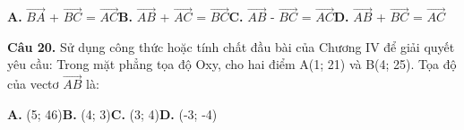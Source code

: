 \documentclass[11pt,a4paper]{article}
\begin{document}
\hspace*{1.5em}\textbf{A.} $\overrightarrow{BA}$ + $\overrightarrow{BC}$ = $\overrightarrow{AC}$\quad\quad \textbf{B.} $\overrightarrow{AB}$ + $\overrightarrow{AC}$ = $\overrightarrow{BC}$\quad\quad \textbf{C.} $\overrightarrow{AB}$ - $\overrightarrow{BC}$ = $\overrightarrow{AC}$\quad\quad \textbf{D.} $\overrightarrow{AB}$ + $\overrightarrow{BC}$ = $\overrightarrow{AC}$\par\vspace{2pt}
\textbf{\color{primary} Câu 20.} Sử dụng công thức hoặc tính chất đầu bài của Chương IV để giải quyết yêu cầu: Trong mặt phẳng tọa độ Oxy, cho hai điểm A(1; 21) và B(4; 25). Tọa độ của vectơ $\overrightarrow{AB}$ là:\par
\hspace*{1.5em}\textbf{A.} (5; 46)\quad\quad \textbf{B.} (4; 3)\quad\quad \textbf{C.} (3; 4)\quad\quad \textbf{D.} (-3; -4)\par\vspace{2pt}
\end{document}
